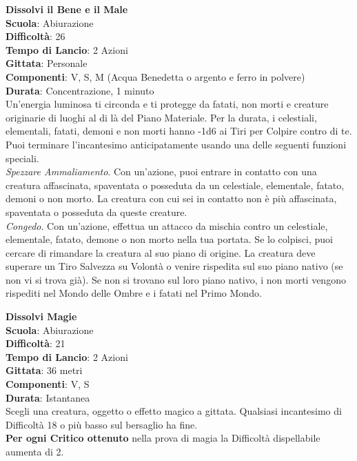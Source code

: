 \begin{multicols}{2}
\medskip\textbf{Dissolvi il Bene e il Male}\\
\textbf{Scuola}: Abiurazione\\
\textbf{Difficoltà}: 26\\
\textbf{Tempo di Lancio}: 2 Azioni\\
\textbf{Gittata}: Personale\\
\textbf{Componenti}: V, S, M (Acqua Benedetta o argento e ferro in polvere)\\
\textbf{Durata}: Concentrazione, 1 minuto \\
Un'energia luminosa ti circonda e ti protegge da fatati, non morti e creature originarie di luoghi al di là del Piano Materiale. Per la durata, i celestiali, elementali, fatati, demoni e non morti hanno -1d6 ai Tiri per Colpire contro di te. Puoi terminare l'incantesimo anticipatamente usando una delle seguenti funzioni speciali.\\
\textit{Spezzare Ammaliamento}. Con un'azione, puoi entrare in contatto con una creatura affascinata, spaventata o posseduta da un celestiale, elementale, fatato, demoni o non morto. La creatura con cui sei in contatto non è più affascinata, spaventata o posseduta da queste creature.\\
\textit{Congedo}. Con un'azione, effettua un attacco da mischia contro un celestiale, elementale, fatato, demone o non morto nella tua portata. Se lo colpisci, puoi cercare di rimandare la creatura al suo piano di origine. La creatura deve superare un Tiro Salvezza su Volontà o venire rispedita sul suo piano nativo (se non vi si trova già). Se non si trovano sul loro piano nativo, i non morti vengono rispediti nel Mondo delle Ombre e i fatati nel Primo Mondo.

\medskip\textbf{Dissolvi Magie}\\
\textbf{Scuola}: Abiurazione\\
\textbf{Difficoltà}: 21\\
\textbf{Tempo di Lancio}: 2 Azioni\\
\textbf{Gittata}: 36 metri\\
\textbf{Componenti}: V, S\\
\textbf{Durata}: Istantanea\\
Scegli una creatura, oggetto o effetto magico a gittata. Qualsiasi incantesimo di Difficoltà 18 o più basso sul bersaglio ha fine. \\
\textbf{Per ogni Critico ottenuto} nella prova di magia la Difficoltà dispellabile aumenta di 2.


\end{multicols}
